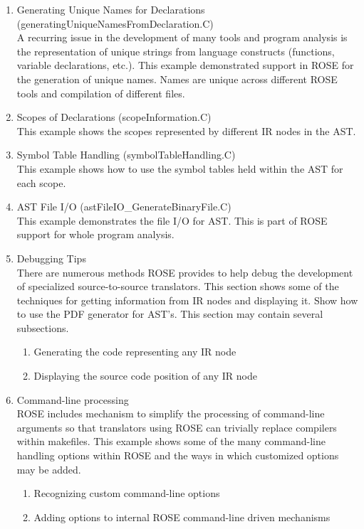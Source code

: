 \begin{enumerate}
     \item Generating Unique Names for Declarations (generatingUniqueNamesFromDeclaration.C) \\
           A recurring issue in the development of many tools and program analysis is the
           representation of unique strings from language constructs (functions, variable
           declarations, etc.).  This example demonstrated support in ROSE for the
           generation of unique names. Names are unique across different ROSE tools and
           compilation of different files.

     \item Scopes of Declarations (scopeInformation.C) \\
           This example shows the scopes represented by different IR nodes in the AST.

     \item Symbol Table Handling (symbolTableHandling.C) \\
           This example shows how to use the symbol tables held within the AST for each scope.

     \item AST File I/O (astFileIO\_GenerateBinaryFile.C) \\
           This example demonstrates the file I/O for AST.  This is part of
           ROSE support for whole program analysis.

     \item Debugging Tips \\
           There are numerous methods ROSE provides to help debug the 
           development of specialized source-to-source translators.
           This section shows some of the techniques for getting
           information from IR nodes and displaying it.  Show how to 
           use the PDF generator for AST's.  This section may
           contain several subsections.
     \begin{enumerate}
          \item Generating the code representing any IR node
          \item Displaying the source code position of any IR node
     \end{enumerate}

     \item Command-line processing \\
           ROSE includes mechanism to simplify the processing of command-line arguments
           so that translators using ROSE can trivially replace compilers within
           makefiles.  This example shows some of the many command-line handling
           options within ROSE and the ways in which customized options may be added.
     \begin{enumerate}
          \item Recognizing custom command-line options
          \item Adding options to internal ROSE command-line driven mechanisms
     \end{enumerate}


\end{enumerate}
